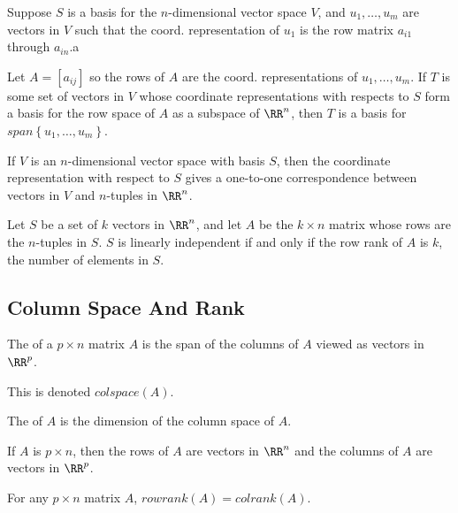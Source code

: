 \begin{theorem}
  Suppose $S$ is a basis for the $n$-dimensional vector space $V$, and $u_{1}, \dots, u_{m}$ are vectors in $V$ such that the coord. representation of $u_{1}$
  is the row matrix $a_{i1}$ through $a_{in}$.a

  Let $A = \left[a_{ij}\right]$ so the rows of $A$ are the coord. representations of $u_{1}, \dots, u_{m}$.
  If $T$ is some set of vectors in $V$ whose coordinate representations with respects to $S$ form a basis for the row space of $A$ 
  as a subspace of $\RR^{n}$, then $T$ is a basis for $span \left\{u_{1}, \dots, u_{m}\right\}$.
\end{theorem}

\begin{remark}
  If $V$ is an $n$-dimensional vector space with basis $S$, then the coordinate representation with respect to $S$ gives a 
  one-to-one correspondence between vectors in $V$ and $n$-tuples in $\RR^{n}$.
\end{remark}

\begin{theorem}
  Let $S$ be a set of $k$ vectors in $\RR^{n}$, and let $A$ be the $k \times n$ matrix whose rows are the $n$-tuples in $S$.
  $S$ is linearly independent if and only if the row rank of $A$ is $k$, the number of elements in $S$.
\end{theorem}

\subsection{Column Space And Rank}
\begin{definition}
  The  of a $p \times n$ matrix $A$ is the span of the columns of $A$ viewed as vectors in $\RR^{p}$.

  This is denoted $colspace(A)$.
\end{definition}

\begin{definition}
  The  of $A$ is the dimension of the column space of $A$.
\end{definition}

\begin{remark}
  If $A$ is $p \times n$, then the rows of $A$ are vectors in $\RR^{n}$ and the columns of $A$ are vectors in $\RR^{p}$.
\end{remark}

\begin{theorem}
  For any $p \times n$ matrix $A$, $rowrank(A) = colrank(A)$.
\end{theorem}

